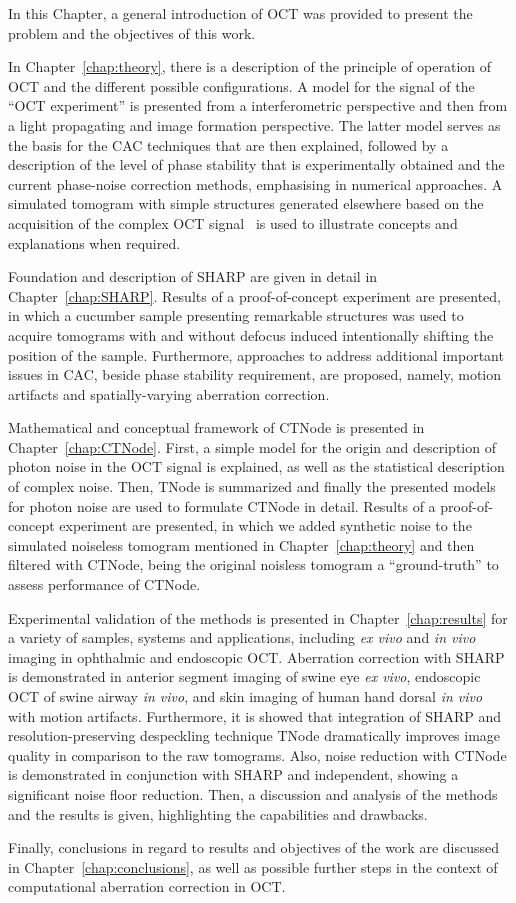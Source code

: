 In this Chapter, a general introduction of OCT was provided to present the problem and the objectives of this work.

In Chapter~\ref{chap:theory}, there is a description of the principle of operation of OCT and the different possible configurations. A model for the signal of the ``OCT experiment'' is presented from a interferometric perspective and then from a light propagating and image formation perspective. The latter model serves as the basis for the CAC techniques that are then explained, followed by a description of the level of phase stability that is experimentally obtained and the current phase-noise correction methods, emphasising in numerical approaches. A simulated tomogram with simple structures generated elsewhere based on the acquisition of the complex OCT signal~\cite{} is used to illustrate concepts and explanations when required.

Foundation and description of SHARP are given in detail in Chapter~\ref{chap:SHARP}. Results of a proof-of-concept experiment are presented, in which a cucumber sample presenting remarkable structures was used to acquire tomograms with and without defocus induced intentionally shifting the position of the sample. Furthermore, approaches to address additional important issues in CAC, beside phase stability requirement, are proposed, namely, motion artifacts and spatially-varying aberration correction.

Mathematical and conceptual framework of CTNode is presented in Chapter~\ref{chap:CTNode}. First, a simple model for the origin and description of photon noise in the OCT signal is explained, as well as the statistical description of complex noise. Then, TNode is summarized and finally the presented models for photon noise are used to formulate CTNode in detail. Results of a proof-of-concept experiment are presented, in which we added synthetic noise to the simulated noiseless tomogram mentioned in Chapter~\ref{chap:theory} and then filtered with CTNode, being the original noisless tomogram a ``ground-truth'' to assess performance of CTNode.

Experimental validation of the methods is presented in Chapter~\ref{chap:results} for a variety of samples, systems and applications, including \textit{ex vivo} and \textit{in vivo} imaging in ophthalmic and endoscopic OCT. Aberration correction with SHARP is demonstrated in anterior segment imaging of swine eye \textit{ex vivo}, endoscopic OCT of swine airway \textit{in vivo}, and skin imaging of human hand dorsal \textit{in vivo} with motion artifacts. Furthermore, it is showed that integration of SHARP and resolution-preserving despeckling technique TNode dramatically improves image quality in comparison to the raw tomograms. Also, noise reduction with CTNode is demonstrated in conjunction with SHARP and independent, showing a significant noise floor reduction. Then, a discussion and analysis of the methods and the results is given, highlighting the capabilities and drawbacks.

Finally, conclusions in regard to results and objectives of the work are discussed in Chapter~\ref{chap:conclusions}, as well as possible further steps in the context of computational aberration correction in OCT.